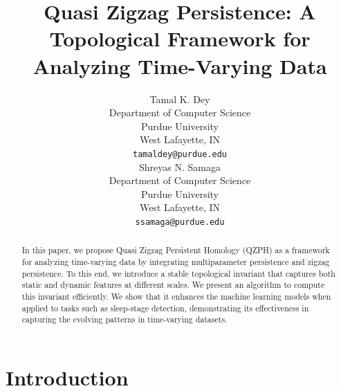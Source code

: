 \documentclass{article}
\title{Quasi Zigzag Persistence: A Topological Framework for Analyzing Time-Varying Data}
\author{%
  Tamal K. Dey \\
  Department of Computer Science\\
  Purdue University\\
  West Lafayette, IN \\
  \texttt{tamaldey@purdue.edu} \\
  \And
  Shreyas N. Samaga \\
  Department of Computer Science \\
  Purdue University \\
  West Lafayette, IN \\
  \texttt{ssamaga@purdue.edu} \\
}
\theoremstyle{plain}
\theoremstyle{definition}
\theoremstyle{remark}
\begin{document}
\maketitle

\begin{abstract}
  In this paper, we propose Quasi Zigzag Persistent Homology (QZPH) as a framework for analyzing time-varying data by integrating multiparameter persistence and zigzag persistence. To this end, we introduce a stable topological invariant that captures both static and dynamic features at different scales. We present an algorithm to compute this invariant efficiently. We show that it enhances the machine learning models when applied to tasks such as sleep-stage detection, demonstrating its effectiveness in capturing the evolving patterns in time-varying datasets.
\end{abstract}

\section{Introduction}



\end{document}
